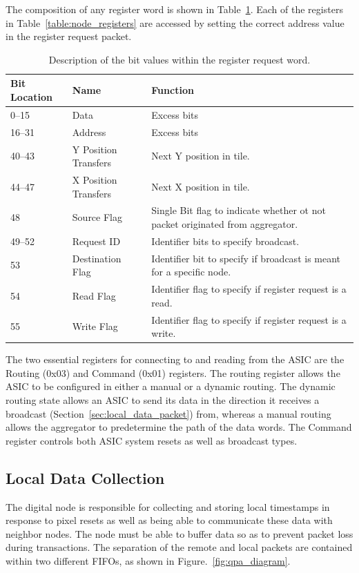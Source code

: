 The composition of any register word is shown in Table~\ref{tab:packet_register}.
Each of the registers in Table~\ref{table:node_registers} are accessed by setting the correct address value in the register request packet.
\begin{table}
\begin{center}
\begin{tabular}{|| p{30mm} | p{30mm} | p{90mm} ||}
 \hline
 Bit Location & Name & Function \\ [0.5ex]
 \hline\hline
  0--15 & Data & Excess bits \\
 \hline
  16--31 & Address & Excess bits \\
 \hline
  40--43 & Y Position Transfers & Next Y position in tile. \\
 \hline
  44--47 & X Position Transfers & Next X position in tile. \\
 \hline
  48 & Source Flag & Single Bit flag to indicate whether ot not packet originated from aggregator. \\
 \hline
  49--52 & Request ID & Identifier bits to specify broadcast. \\
 \hline
  53 & Destination Flag & Identifier bit to specify if broadcast is meant for a specific node. \\
 \hline
  54 & Read Flag & Identifier flag to specify if register request is a read. \\
 \hline
  55 & Write Flag & Identifier flag to specify if register request is a write. \\
 \hline
\end{tabular}
\caption{Description of the bit values within the register request word.}
\label{tab:packet_register}
\end{center}
\end{table}

The two essential registers for connecting to and reading from the ASIC are the Routing (0x03) and Command (0x01) registers.
The routing register allows the ASIC to be configured in either a manual or a dynamic routing.
The dynamic routing state allows an ASIC to send its data in the direction it receives a broadcast (Section~\ref{sec:local_data_packet}) from, whereas a manual routing allows the aggregator to predetermine the path of the data words.
The Command register controls both ASIC system resets as well as broadcast types.

\subsection{Local Data Collection}\label{sec:data_collection}
The digital node is responsible for collecting and storing local timestamps in response to pixel resets as well as being able to communicate these data with neighbor nodes.
The node must be able to buffer data so as to prevent packet loss during transactions.
The separation of the remote and local packets are contained within two different FIFOs, as shown in Figure.~\ref{fig:qpa_diagram}.


